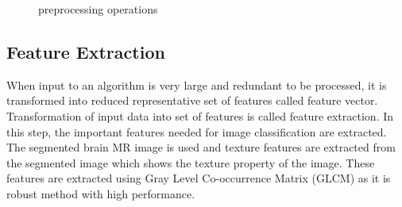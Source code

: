 \documentclass[11pt]{article}
\begin{document}
	\begin{figure}[H]
		\centering
		\hspace{0.5cm}
		\hspace{0.5cm}
		\hspace{0.5cm}
		\caption{preprocessing operations}
		\label{Preprocessing Operations}
	\end{figure}

	\subsection{Feature Extraction}%
	\label{sub:Feature Extraction}

	When input to an algorithm is very large and
	redundant to be processed, it is transformed into reduced representative set
	of features called feature vector. Transformation of input data into set of
	features is called feature extraction. In this step, the important features
	needed for image classification are extracted. The segmented brain MR image
	is used and texture features are extracted from the segmented image which
	shows the texture property of the image. These features are extracted using
	Gray Level Co-occurrence Matrix (GLCM) as it is robust method with high
	performance.
\end{document}
